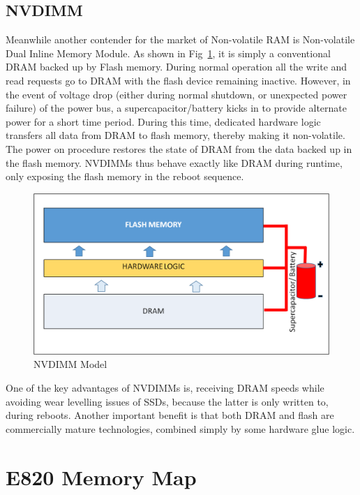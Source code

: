 \subsection{NVDIMM}
Meanwhile another contender for the market of Non-volatile RAM is Non-volatile Dual Inline Memory Module. As shown in Fig~\ref{fig:nvdimm}, it is simply a conventional DRAM backed up by Flash memory. During normal operation all the write and read requests go to DRAM with the flash device remaining inactive. However, in the event of voltage drop (either during normal shutdown, or unexpected power failure) of the power bus, a supercapacitor/battery kicks in to provide alternate power for a short time period. During this time, dedicated hardware logic transfers all data from DRAM to flash memory, thereby making it non-volatile. The power on procedure restores the state of DRAM from the data backed up in the flash memory. NVDIMMs thus behave exactly like DRAM during runtime, only exposing the flash memory in the reboot sequence. 


\setlength{\belowcaptionskip}{-10pt}

\begin{figure}[H]
  \centering
  \includegraphics[scale=0.6]{figures/NVDIMM_Stack.png}
  \caption{NVDIMM Model}
  \label{fig:nvdimm}
\end{figure}


One of the key advantages of NVDIMMs is, receiving DRAM speeds while avoiding wear levelling issues of SSDs, because the latter is only written to, during reboots. Another important benefit is that both DRAM and flash are commercially mature technologies, combined simply by some hardware glue logic. 

\section{E820 Memory Map}


